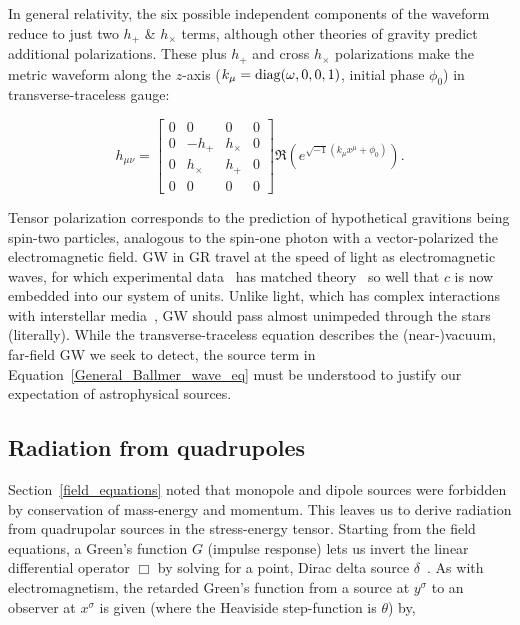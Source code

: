 In general relativity, the six possible independent components of the waveform reduce to just two $h_+$ \& $h_\times$ terms, although other theories of gravity predict additional polarizations.
These plus $h_+$ and cross $h_\times$ polarizations make the metric waveform along the $z$-axis ($k_\mu = \textup{diag}(\omega,0,0,1)$, initial phase $\phi_0$) in transverse-traceless gauge:

\begin{equation}
h_{\mu\nu} =
\left[
\begin{array}{cccc}
0 & 0 & 0 & 0\\
0 & -h_+ & h_\times & 0 \\
0 & h_\times & h_+ & 0\\
0 & 0 & 0 & 0
\end{array} \right] \Re \left(e^{\sqrt{-1} (k_\mu x^\mu + \phi_0)} \right).
\label{GW-matrix-eq}
\end{equation}

\noindent Tensor polarization corresponds to the prediction of hypothetical gravitions being spin-two particles, analogous to the spin-one photon with a vector-polarized the electromagnetic field.
GW in GR travel at the speed of light as electromagnetic waves, for which experimental data~\cite{CODATA} has matched theory~\cite{GriffithsE} so well that $c$ is now embedded into our system of units.
Unlike light, which has complex interactions with interstellar media~\cite{Caldwell1981,McKee1977}, GW should pass almost unimpeded through the stars (literally). 
While the transverse-traceless equation describes the (near-)vacuum, far-field GW we seek to detect, the source term in Equation~\ref{General_Ballmer_wave_eq} must be understood to justify our expectation of astrophysical sources.


        \subsection{Radiation from quadrupoles}
        \label{radiation}

Section~\ref{field_equations} noted that monopole and dipole sources were forbidden by conservation of mass-energy and momentum. This leaves us to derive radiation from quadrupolar sources in the stress-energy tensor.
Starting from the field equations, a Green's function $G$ (impulse response) lets us invert the linear differential operator $\Box$ by solving for a point, Dirac delta source $\delta$~\cite{Carroll1997}.
As with electromagnetism, the retarded Green's function from a source at $y^\sigma$ to an observer at $x^\sigma$ is given (where the Heaviside step-function is $\theta$) by, 

